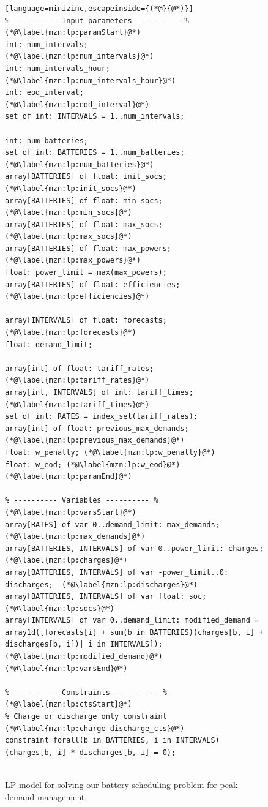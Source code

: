 \begin{figure}[hp!]
	\centering
	\label{pdm:method:lp}
	\caption{\gls{LP} model for solving our battery scheduling problem for peak demand management}
	\begin{lstlisting}[language=minizinc,escapeinside={(*@}{@*)}]
% ---------- Input parameters ---------- % (*@\label{mzn:lp:paramStart}@*) 		
int: num_intervals; 			(*@\label{mzn:lp:num_intervals}@*)
int: num_intervals_hour;    (*@\label{mzn:lp:num_intervals_hour}@*) 
int: eod_interval; 				(*@\label{mzn:lp:eod_interval}@*) 
set of int: INTERVALS = 1..num_intervals; 
	
int: num_batteries;
set of int: BATTERIES = 1..num_batteries;			(*@\label{mzn:lp:num_batteries}@*)
array[BATTERIES] of float: init_socs;   	   (*@\label{mzn:lp:init_socs}@*)
array[BATTERIES] of float: min_socs;      (*@\label{mzn:lp:min_socs}@*)
array[BATTERIES] of float: max_socs;     (*@\label{mzn:lp:max_socs}@*)
array[BATTERIES] of float: max_powers;   	 	   (*@\label{mzn:lp:max_powers}@*)
float: power_limit = max(max_powers);			
array[BATTERIES] of float: efficiencies;				(*@\label{mzn:lp:efficiencies}@*)

array[INTERVALS] of float: forecasts;					(*@\label{mzn:lp:forecasts}@*)
float: demand_limit;
	
array[int] of float: tariff_rates;								(*@\label{mzn:lp:tariff_rates}@*)
array[int, INTERVALS] of int: tariff_times;			   (*@\label{mzn:lp:tariff_times}@*)
set of int: RATES = index_set(tariff_rates); 
array[int] of float: previous_max_demands; 		  (*@\label{mzn:lp:previous_max_demands}@*)
float: w_penalty; (*@\label{mzn:lp:w_penalty}@*) 
float: w_eod; (*@\label{mzn:lp:w_eod}@*) 	(*@\label{mzn:lp:paramEnd}@*)
	
% ---------- Variables ---------- % (*@\label{mzn:lp:varsStart}@*)
array[RATES] of var 0..demand_limit: max_demands; 				       (*@\label{mzn:lp:max_demands}@*)
array[BATTERIES, INTERVALS] of var 0..power_limit: charges;        (*@\label{mzn:lp:charges}@*)
array[BATTERIES, INTERVALS] of var -power_limit..0: discharges;  (*@\label{mzn:lp:discharges}@*)
array[BATTERIES, INTERVALS] of var float: soc;								 (*@\label{mzn:lp:socs}@*)
array[INTERVALS] of var 0..demand_limit: modified_demand = array1d([forecasts[i] + sum(b in BATTERIES)(charges[b, i] + discharges[b, i])| i in INTERVALS]);  (*@\label{mzn:lp:modified_demand}@*) (*@\label{mzn:lp:varsEnd}@*)

% ---------- Constraints ---------- %	(*@\label{mzn:lp:ctsStart}@*)
% Charge or discharge only constraint   (*@\label{mzn:lp:charge-discharge_cts}@*)
constraint forall(b in BATTERIES, i in INTERVALS) (charges[b, i] * discharges[b, i] = 0); 


\end{lstlisting}
\end{figure}
